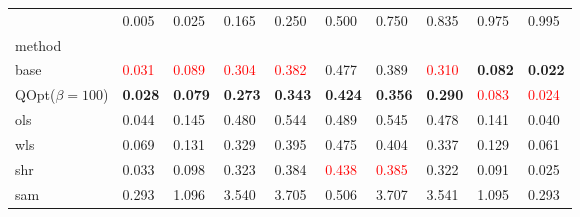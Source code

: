 \begin{tabular}{llllllllll}
\toprule
 & 0.005 & 0.025 & 0.165 & 0.250 & 0.500 & 0.750 & 0.835 & 0.975 & 0.995 \\
method &  &  &  &  &  &  &  &  &  \\
\midrule
base & \textcolor{red}{0.031} & \textcolor{red}{0.089} & \textcolor{red}{0.304} & \textcolor{red}{0.382} & 0.477 & 0.389 & \textcolor{red}{0.310} & \textbf{0.082} & \textbf{0.022} \\
\midrule
QOpt($\beta=100$) & \textbf{0.028} & \textbf{0.079} & \textbf{0.273} & \textbf{0.343} & \textbf{0.424} & \textbf{0.356} & \textbf{0.290} & \textcolor{red}{0.083} & \textcolor{red}{0.024} \\
ols & 0.044 & 0.145 & 0.480 & 0.544 & 0.489 & 0.545 & 0.478 & 0.141 & 0.040 \\
wls & 0.069 & 0.131 & 0.329 & 0.395 & 0.475 & 0.404 & 0.337 & 0.129 & 0.061 \\
shr & 0.033 & 0.098 & 0.323 & 0.384 & \textcolor{red}{0.438} & \textcolor{red}{0.385} & 0.322 & 0.091 & 0.025 \\
sam & 0.293 & 1.096 & 3.540 & 3.705 & 0.506 & 3.707 & 3.541 & 1.095 & 0.293 \\
\bottomrule
\end{tabular}